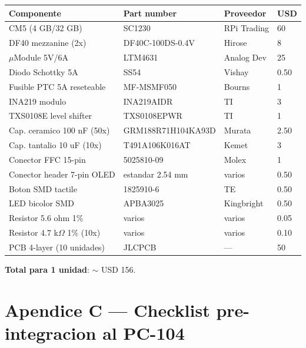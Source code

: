 \documentclass[11pt,a4paper,oneside,openright]{book}
\begin{document}
\begin{center}
\begin{longtable}{p{4cm}p{4cm}p{2.5cm}p{2cm}}
\toprule
\textbf{Componente} & \textbf{Part number} & \textbf{Proveedor} & \textbf{USD} \\
\midrule
\endhead
CM5 (4 GB/32 GB)                  & SC1230                 & RPi Trading & 60 \\
DF40 mezzanine (2x)                & DF40C-100DS-0.4V       & Hirose      & 8 \\
$\mu$Module 5V/6A                  & LTM4631                & Analog Dev  & 25 \\
Diodo Schottky 5A                  & SS54                   & Vishay      & 0.50 \\
Fusible PTC 5A reseteable          & MF-MSMF050             & Bourns      & 1 \\
INA219 modulo                      & INA219AIDR             & TI          & 3 \\
TXS0108E level shifter             & TXS0108EPWR            & TI          & 1 \\
Cap. ceramico 100 nF (50x)         & GRM188R71H104KA93D     & Murata      & 2.50 \\
Cap. tantalio 10 uF (10x)          & T491A106K016AT         & Kemet       & 3 \\
Conector FFC 15-pin                & 5025810-09             & Molex       & 1 \\
Conector header 7-pin OLED         & estandar 2.54 mm       & varios      & 0.50 \\
Boton SMD tactile                  & 1825910-6              & TE          & 0.50 \\
LED bicolor SMD                    & APBA3025               & Kingbright  & 0.50 \\
Resistor 5.6 ohm 1\%               & varios                 & varios      & 0.05 \\
Resistor 4.7 k$\Omega$ 1\% (10x)    & varios                 & varios      & 0.10 \\
PCB 4-layer (10 unidades)          & JLCPCB                 & ---         & 50 \\
\bottomrule
\end{longtable}
\end{center}

\textbf{Total para 1 unidad}: $\sim$ USD 156.

\chapter{Apendice C --- Checklist pre-integracion al PC-104}
\end{document}
